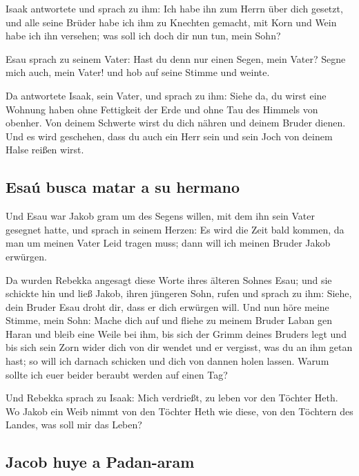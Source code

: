  Isaak antwortete und sprach zu ihm: Ich habe ihn zum
Herrn über dich gesetzt, und alle seine Brüder habe ich ihm zu Knechten
gemacht, mit Korn und Wein habe ich ihn versehen; was soll ich doch dir
nun tun, mein Sohn?

 Esau sprach zu seinem Vater: Hast du denn nur einen
Segen, mein Vater? Segne mich auch, mein Vater! und hob auf seine Stimme
und weinte.

 Da antwortete Isaak, sein Vater, und sprach zu ihm:
Siehe da, du wirst eine Wohnung haben ohne Fettigkeit der Erde und ohne
Tau des Himmels von obenher.  Von deinem Schwerte wirst
du dich nähren und deinem Bruder dienen. Und es wird geschehen, dass du
auch ein Herr sein und sein Joch von deinem Halse reißen wirst.

\hypertarget{esauxfa-busca-matar-a-su-hermano}{%
\subsection{Esaú busca matar a su
hermano}\label{esauxfa-busca-matar-a-su-hermano}}

 Und Esau war Jakob gram um des Segens willen, mit dem
ihn sein Vater gesegnet hatte, und sprach in seinem Herzen: Es wird die
Zeit bald kommen, da man um meinen Vater Leid tragen muss; dann will ich
meinen Bruder Jakob erwürgen.

 Da wurden Rebekka angesagt diese Worte ihres älteren
Sohnes Esau; und sie schickte hin und ließ Jakob, ihren jüngeren Sohn,
rufen und sprach zu ihm: Siehe, dein Bruder Esau droht dir, dass er dich
erwürgen will.  Und nun höre meine Stimme, mein Sohn:
Mache dich auf und fliehe zu meinem Bruder Laban gen Haran
 und bleib eine Weile bei ihm, bis sich der Grimm deines
Bruders legt  und bis sich sein Zorn wider dich von dir
wendet und er vergisst, was du an ihm getan hast; so will ich darnach
schicken und dich von dannen holen lassen. Warum sollte ich euer beider
beraubt werden auf einen Tag?

 Und Rebekka sprach zu Isaak: Mich verdrießt, zu leben
vor den Töchter Heth. Wo Jakob ein Weib nimmt von den Töchter Heth wie
diese, von den Töchtern des Landes, was soll mir das Leben?

\hypertarget{jacob-huye-a-padan-aram}{%
\subsection{Jacob huye a Padan-aram}\label{jacob-huye-a-padan-aram}}

